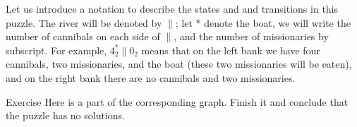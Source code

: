 Let us introduce a notation to describe the states and and transitions in this puzzle.
The river will be denoted by ${\parallel}$;
let $*$ denote the boat, we will write the number of cannibals on each side of ${\parallel}$, and the number of missionaries by subscript. 
For example, $4_2^*{\parallel}0_2$ means that on the left bank we have four cannibals, two missionaries, and the boat (these two missionaries will be eaten), and on the right bank there are no cannibals and two missionaries.

\begin{thm}{Exercise}
Here is a part of the corresponding graph.
Finish it and conclude that the puzzle has no solutions.

\begin{center}
\end{center}

\end{thm}


